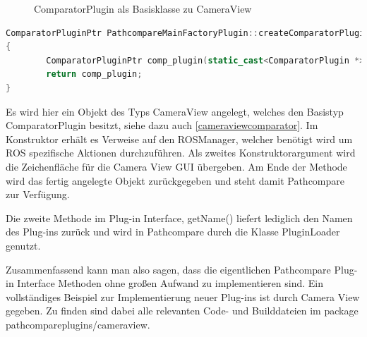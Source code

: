  \begin{figure}[t]
   \begin{center}
   \end{center}
   \caption{ComparatorPlugin als Basisklasse zu CameraView}
   \label{fig:cameraviewcomparator}
 \end{figure}

\begin{lstlisting}[caption=Implementierung der createComparatorPlugin in Camera View, language=C++, basicstyle=\footnotesize, label=lst:create]
ComparatorPluginPtr PathcompareMainFactoryPlugin::createComparatorPlugin(ROSManager * ros_manager, QWidget *tab_widget) const
{
        ComparatorPluginPtr comp_plugin(static_cast<ComparatorPlugin *>(new CameraView(ros_manager, tab_widget)));
        return comp_plugin;
}
\end{lstlisting}

Es wird hier ein Objekt des Typs CameraView angelegt, welches den Basistyp
ComparatorPlugin besitzt, siehe dazu auch \autoref{cameraviewcomparator}. Im
Konstruktor erhält es Verweise auf den ROSManager, welcher benötigt wird um ROS
spezifische Aktionen durchzuführen. Als zweites Konstruktorargument wird die
Zeichenfläche für die Camera View GUI übergeben.  Am Ende der Methode wird das
fertig angelegte Objekt zurückgegeben und steht damit Pathcompare zur
Verfügung. 

Die zweite Methode im Plug-in Interface, getName() liefert lediglich den Namen
des Plug-ins zurück und wird in Pathcompare durch die Klasse PluginLoader
genutzt.

Zusammenfassend kann man also sagen, dass die eigentlichen Pathcompare Plug-in Interface
Methoden ohne großen Aufwand zu implementieren sind. Ein vollständiges
Beispiel zur Implementierung neuer Plug-ins ist durch Camera View gegeben.
Zu finden sind dabei alle relevanten Code- und Builddateien im package 
pathcompareplugins/cameraview.

